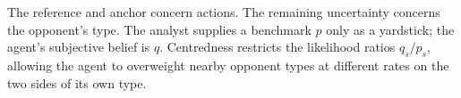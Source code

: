 \documentclass[12pt]{article}
\theoremstyle{definition}
\begin{document}


The reference and anchor concern actions. The remaining uncertainty concerns the opponent's type. The analyst supplies a benchmark $p$ only as a yardstick; the agent's subjective belief is $q$. Centredness restricts the likelihood ratios $q_s/p_s$, allowing the agent to overweight nearby opponent types at different rates on the two sides of its own type.
\end{document}
